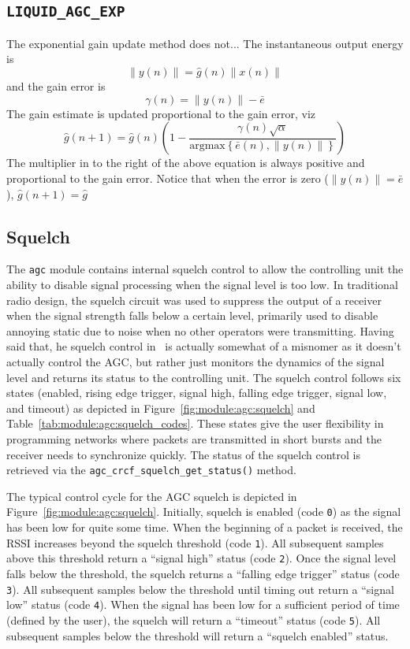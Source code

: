 \subsection{{\tt LIQUID\_AGC\_EXP}}
The exponential gain update method does not...
The instantaneous output energy is
\[  \|y(n)\| = \hat{g}(n)\|x(n)\|      \]
and the gain error is
\[
    \gamma(n) = \|y(n)\| - \bar{e}
\]
The gain estimate is updated proportional to the gain error, viz
\[
    \hat{g}(n+1) =
        \hat{g}(n) \left(1 -
         \frac{
            \gamma(n)\sqrt{\alpha}
        }{
            \text{argmax}\left\{\bar{e}(n),\|y(n)\|\right\}
        }
    \right)
\]
The multiplier in to the right of the above equation is always positive
and proportional to the gain error.
Notice that when the error is zero ($\|y(n)\| = \bar{e}$),
$\hat{g}(n+1) = \hat{g}$

\subsection{Squelch}
The {\tt agc} module contains internal squelch control to allow the
controlling unit the ability to disable signal processing when the signal
level is too low.
In traditional radio design, the squelch circuit was used to suppress the
output of a receiver when the signal strength falls below a certain level,
primarily used to disable annoying static due to noise when no other operators
were transmitting.
Having said that, he squelch control in \liquid\ is actually somewhat of a
misnomer as it doesn't actually control the AGC, but rather just monitors the
dynamics of the signal level and returns its status to the controlling unit.
The squelch control follows six states
(enabled, rising edge trigger, signal high, falling edge trigger,
signal low, and timeout)
as depicted in
Figure~\ref{fig:module:agc:squelch} and
Table~\ref{tab:module:agc:squelch_codes}.
These states give the user flexibility in programming networks where packets
are transmitted in short bursts and the receiver needs to synchronize quickly.
The status of the squelch control is retrieved via the
{\tt agc\_crcf\_squelch\_get\_status()} method.

The typical control cycle for the AGC squelch is depicted in
Figure~\ref{fig:module:agc:squelch}.
Initially, squelch is enabled (code {\tt 0}) as the signal has been low for
quite some time.
When the beginning of a packet is received, the RSSI increases beyond the
squelch threshold (code {\tt 1}).
All subsequent samples above this threshold return a ``signal high'' status
(code {\tt 2}).
Once the signal level falls below the threshold, the squelch returns a
``falling edge trigger'' status (code {\tt 3}).
All subsequent samples below the threshold until timing out return a ``signal
low'' status (code {\tt 4}).
When the signal has been low for a sufficient period of time (defined by the
user), the squelch will return a ``timeout'' status (code {\tt 5}).
All subsequent samples below the threshold will return a ``squelch enabled''
status.

